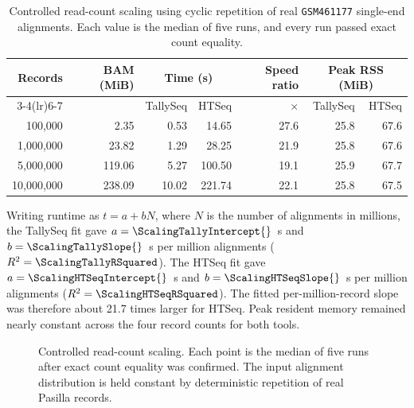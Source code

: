 \documentclass[11pt]{article}
\begin{document}
\begin{table}[ht]
\centering
\caption{Controlled read-count scaling using cyclic repetition of real \texttt{GSM461177} single-end alignments. Each value is the median of five runs, and every run passed exact count equality.}
\label{tab:scaling}
\begin{tabular}{rrrrrrr}
\toprule
Records & BAM (MiB) & \multicolumn{2}{c}{Time (s)} & Speed ratio & \multicolumn{2}{c}{Peak RSS (MiB)} \\
\cmidrule(lr){3-4}\cmidrule(lr){6-7}
 & & TallySeq & HTSeq & $\times$ & TallySeq & HTSeq \\
\midrule
100,000 & 2.35 & 0.53 & 14.65 & 27.6 & 25.8 & 67.6 \\
1,000,000 & 23.82 & 1.29 & 28.25 & 21.9 & 25.8 & 67.6 \\
5,000,000 & 119.06 & 5.27 & 100.50 & 19.1 & 25.9 & 67.7 \\
10,000,000 & 238.09 & 10.02 & 221.74 & 22.1 & 25.8 & 67.5 \\
\bottomrule
\end{tabular}
\end{table}

Writing runtime as $t = a + bN$, where $N$ is the number of alignments in millions, the TallySeq fit gave $a=\ScalingTallyIntercept{}$~s and $b=\ScalingTallySlope{}$~s per million alignments ($R^2=\ScalingTallyRSquared$). The HTSeq fit gave $a=\ScalingHTSeqIntercept{}$~s and $b=\ScalingHTSeqSlope{}$~s per million alignments ($R^2=\ScalingHTSeqRSquared$). The fitted per-million-record slope was therefore about 21.7 times larger for HTSeq. Peak resident memory remained nearly constant across the four record counts for both tools.

\begin{figure}[ht]
\centering
{}
\caption{Controlled read-count scaling. Each point is the median of five runs after exact count equality was confirmed. The input alignment distribution is held constant by deterministic repetition of real Pasilla records.}
\label{fig:scaling}
\end{figure}
\end{document}
